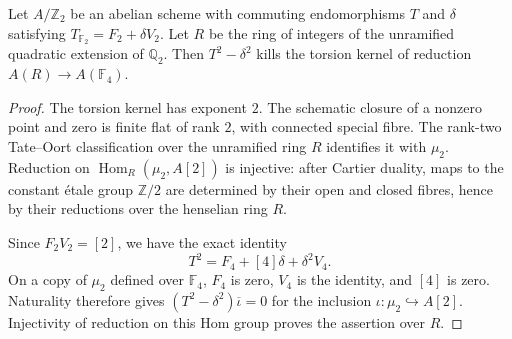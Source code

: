 \begin{lemma}\label{lem:octic-dyadic-F4-kernel}
Let $A/\mathbb Z_2$ be an abelian scheme with commuting
endomorphisms $T$ and $\delta$ satisfying
$T_{\mathbb F_2}=F_2+\delta V_2$. Let $R$ be the ring of
integers of the unramified quadratic extension of $\mathbb Q_2$.
Then $T^2-\delta^2$ kills the torsion kernel of reduction
$A(R)\to A(\mathbb F_4)$.
\end{lemma}
\begin{proof}
The torsion kernel has exponent $2$. The schematic closure
of a nonzero point and zero is finite flat of rank $2$,
with connected special fibre. The rank-two Tate--Oort
classification over the unramified ring $R$ identifies it
with $\mu_2$. Reduction on
$\operatorname{Hom}_R(\mu_2,A[2])$ is injective: after
Cartier duality, maps to the constant \'etale group $\mathbb Z/2$
are determined by their open and closed fibres, hence by
their reductions over the henselian ring $R$.

Since $F_2V_2=[2]$, we have the exact identity
\[
 T^2=F_4+[4]\delta+\delta^2V_4.
\]
On a copy of $\mu_2$ defined over $\mathbb F_4$, $F_4$ is
zero, $V_4$ is the identity, and $[4]$ is zero.
Naturality therefore gives
$(T^2-\delta^2)\overline\iota=0$ for the inclusion
$\iota:\mu_2\hookrightarrow A[2]$. Injectivity of reduction
on this Hom group proves the assertion over $R$.
\end{proof}

